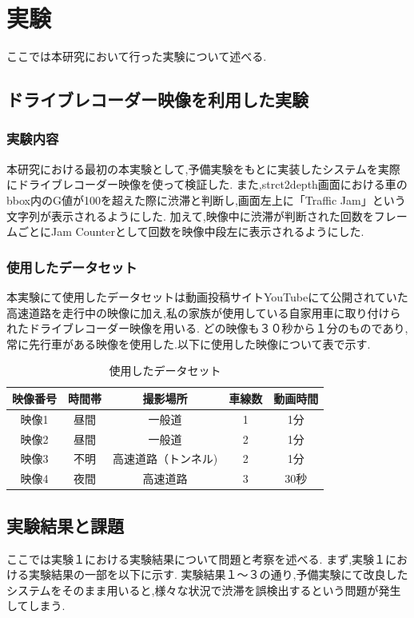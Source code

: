 \chapter{実験}
ここでは本研究において行った実験について述べる.

\section{ドライブレコーダー映像を利用した実験}
\subsection{実験内容}
本研究における最初の本実験として,予備実験をもとに実装したシステムを実際にドライブレコーダー映像を使って検証した.
また,strct2depth画面における車のbbox内のG値が100を超えた際に渋滞と判断し,画面左上に「Traffic Jam」という文字列が表示されるようにした.
加えて,映像中に渋滞が判断された回数をフレームごとにJam Counterとして回数を映像中段左に表示されるようにした.

\subsection{使用したデータセット}
本実験にて使用したデータセットは動画投稿サイトYouTubeにて公開されていた高速道路を走行中の映像に加え,私の家族が使用している自家用車に取り付けられたドライブレコーダー映像を用いる.
どの映像も３０秒から１分のものであり,常に先行車がある映像を使用した.以下に使用した映像について表で示す.

\begin{table}[htbp]
  \centering
  \begin{scriptsize}
  \begin{tabular}{ccccc}
  \toprule
映像番号 & 時間帯 & 撮影場所 & 車線数 & 動画時間\\
  \midrule
映像1 & 昼間 & 一般道 & 1 & 1分\\
映像2 & 昼間 & 一般道 & 2 & 1分\\
映像3 & 不明 & 高速道路（トンネル) & 2 & 1分 \\
映像4 & 夜間 & 高速道路 & 3 & 30秒\\
  \bottomrule
  \end{tabular}
  \end{scriptsize}
  \caption{使用したデータセット}
  \label{tab:dataset}
\end{table}
\newpage
\section{実験結果と課題}
ここでは実験１における実験結果について問題と考察を述べる.
まず,実験１における実験結果の一部を以下に示す.
実験結果１〜３の通り,予備実験にて改良したシステムをそのまま用いると,様々な状況で渋滞を誤検出するという問題が発生してしまう.


